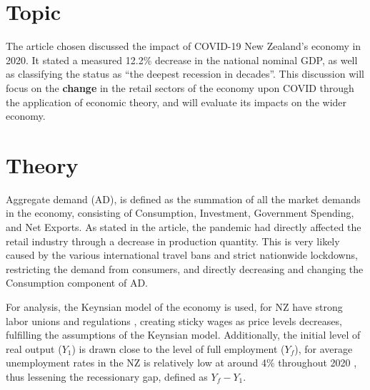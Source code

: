 \documentclass[a4paper,12pt]{article}
\begin{document}


\section*{Topic}
The article chosen discussed the impact of COVID-19 New Zealand's economy in 2020. It stated a measured 12.2\% decrease in the national nominal GDP, as well as classifying the status as ``the deepest recession in decades''. This discussion will focus on the \textbf{change} in the retail sectors of the economy upon COVID through the application of economic theory, and will evaluate its impacts on the wider economy.

\section*{Theory}
Aggregate demand (AD), is defined as the summation of all the market demands in the economy, consisting of Consumption, Investment, Government Spending, and Net Exports. As stated in the article, the pandemic had directly affected the retail industry through a decrease in production quantity. This is very likely caused by the various international travel bans and strict nationwide lockdowns, restricting the demand from consumers, and directly decreasing and changing the Consumption component of AD.

For analysis, the Keynsian model of the economy is used, for NZ have strong labor unions and regulations \parencite{labor}, creating sticky wages as price levels decreases, fulfilling the assumptions of the Keynsian model. Additionally, the initial level of real output ($Y_1$) is drawn close to the level of full employment ($Y_f$), for average unemployment rates in the NZ is relatively low at around 4\% throughout 2020 \parencite{unemploy}, thus lessening the recessionary gap, defined as $Y_f-Y_1$.
\end{document}

